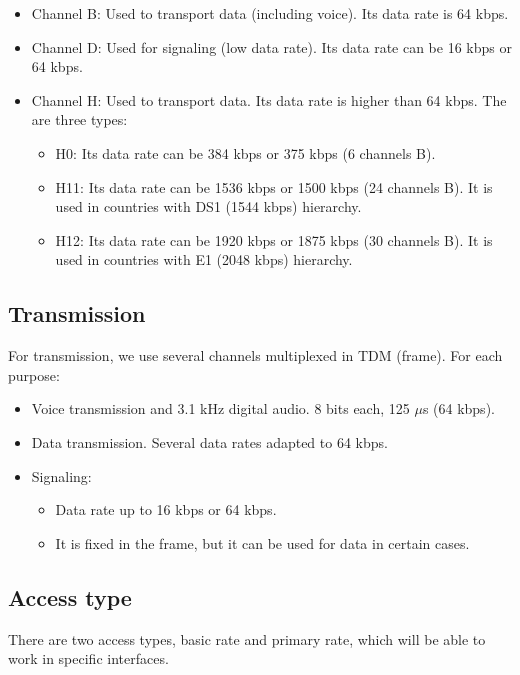 \documentclass[../main.tex]{subfiles}
\begin{document}
\begin{itemize}
	\item Channel B: Used to transport data (including voice). Its data rate is 64 kbps.
	\item Channel D: Used for signaling (low data rate). Its data rate can be 16 kbps or 64 kbps.
	\item {
		Channel H: Used to transport data. Its data rate is higher than 64 kbps. The are three types:
		\begin{itemize}
			\item H0: Its data rate can be 384 kbps or 375 kbps (6 channels B).
			\item H11: Its data rate can be 1536 kbps or 1500 kbps (24 channels B). It is used in countries with DS1 (1544 kbps) hierarchy.
			\item H12: Its data rate can be 1920 kbps or 1875 kbps (30 channels B). It is used in countries with E1 (2048 kbps) hierarchy.
		\end{itemize}
	}
\end{itemize}

\subsection{Transmission}

For transmission, we use several channels multiplexed in TDM (frame). For each purpose:

\begin{itemize}
	\item Voice transmission and 3.1 kHz digital audio. 8 bits each, 125 $\mu$s (64 kbps).
	\item Data transmission. Several data rates adapted to 64 kbps.
	\item {
		Signaling:
		\begin{itemize}
			\item Data rate up to 16 kbps or 64 kbps.
			\item It is fixed in the frame, but it can be used for data in certain cases.
		\end{itemize}
	}
\end{itemize}

\subsection{Access type}

There are two access types, basic rate and primary rate, which will be able to work in specific interfaces.
\end{document}
